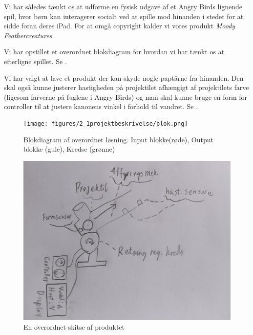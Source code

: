 Vi har således tænkt os at udforme en fysisk udgave af et Angry Birds lignende spil, hvor børn kan interagerer socialt ved at spille mod hinanden i stedet for at sidde foran deres iPad. For at omgå copyright kalder vi vores produkt \emph{Moody Feathercreatures}.

Vi har opstillet et overordnet blokdiagram for hvordan vi har tænkt os at efterligne spillet. Se .

Vi har valgt at lave et produkt der kan skyde nogle paptårne fra hinanden. Den skal også kunne justerer hastigheden på projektilet afhængigt af projektilets farve (ligesom farverne på fuglene i Angry Birds) og man skal kunne bruge en form for controller til at justere kanonens vinkel i forhold til vandret. Se .

\begin{figure}
	\centering
    \texttt{[image: figures/2\_1projektbeskrivelse/blok.png]}
	\caption{Blokdiagram af overordnet løsning. Input blokke(røde), Output blokke (gule), Kredse (grønne)}
	\label{fig:blok}
\end{figure}

\begin{figure}
	\centering
    \includegraphics[width=13cm]{figures/2_1projektbeskrivelse/skitse.jpg}
	\caption{En overordnet skitse af produktet}
	\label{fig:skitse}
\end{figure}




